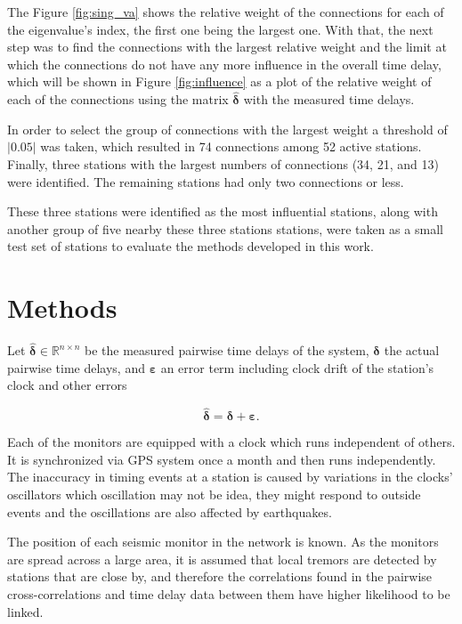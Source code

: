 \documentclass[12pt, sumlimits, intlimits]{article}
\begin{document}
The Figure \ref{fig:sing_va} shows the relative weight of the connections for each of the eigenvalue's index, the first one being the largest one. With that, the next step was to find the connections with the largest relative weight and the limit at which the connections do not have any more influence in the overall time delay, which will be shown in Figure \ref{fig:influence} as a plot of the relative weight of each of the connections using the matrix $\bm{\hat{\delta}}$ with the measured time delays.

In order to select the group of connections with the largest weight a threshold of $|0.05|$ was taken, which resulted in 74 connections among 52 active stations. Finally, three stations with the largest numbers of connections (34, 21, and 13) were identified. The remaining stations had only two connections or less. 

These three stations were identified as the most influential stations, along with another group of five nearby these three stations stations, were taken as a small test set of stations to evaluate the methods developed in this work. 

\section{Methods}

Let $\bm{\hat{\delta}} \in \mathbb{R}^{n\times n}$ be the measured pairwise time delays of the system, $\bm{\delta}$ the actual pairwise time delays, and $\bm{\varepsilon}$ an error term including clock drift of the station's clock and other errors

\begin{equation}
\bm{\hat{\delta}}  = \bm{\delta} + \bm{\varepsilon}.
\label{eq:model}
\end{equation}

Each of the monitors are equipped with a clock which runs independent of others. It is synchronized via GPS system once a month and then runs independently. The inaccuracy in timing events at a station is caused by variations in the clocks' oscillators which oscillation may not be idea, they might respond to outside events and the oscillations are also affected by earthquakes. 

The position of each seismic monitor in the network is known. As the monitors are spread across a large area, it is assumed that local tremors are detected by stations that are close by, and therefore the correlations found in the pairwise cross-correlations and time delay data between them have higher likelihood to be linked. 
\end{document}
